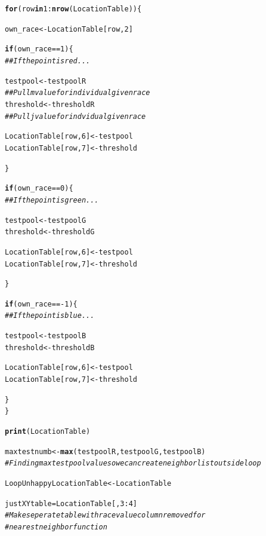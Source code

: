 \documentclass{article}\usepackage[]{graphicx}\usepackage[]{color}
\makeatletter
\newcommand{\hlnum}[1]{\textcolor[rgb]{0.686,0.059,0.569}{#1}}%
\newcommand{\hlcom}[1]{\textcolor[rgb]{0.678,0.584,0.686}{\textit{#1}}}%
\newcommand{\hlopt}[1]{\textcolor[rgb]{0,0,0}{#1}}%
\newcommand{\hlstd}[1]{\textcolor[rgb]{0.345,0.345,0.345}{#1}}%
\newcommand{\hlkwa}[1]{\textcolor[rgb]{0.161,0.373,0.58}{\textbf{#1}}}%
\newcommand{\hlkwb}[1]{\textcolor[rgb]{0.69,0.353,0.396}{#1}}%
\newcommand{\hlkwd}[1]{\textcolor[rgb]{0.737,0.353,0.396}{\textbf{#1}}}%
\newenvironment{kframe}{%
 \def\at@end@of@kframe{}%
 \ifinner\ifhmode%
  \def\at@end@of@kframe{\end{minipage}}%
  \begin{minipage}{\columnwidth}%
 \fi\fi%
 \def\FrameCommand##1{\hskip\@totalleftmargin \hskip-\fboxsep
 \colorbox{shadecolor}{##1}\hskip-\fboxsep
     \hskip-\linewidth \hskip-\@totalleftmargin \hskip\columnwidth}%
 \MakeFramed {\advance\hsize-\width
   \@totalleftmargin\z@ \linewidth\hsize
   \@setminipage}}%
 {\par\unskip\endMakeFramed%
 \at@end@of@kframe}
\newenvironment{knitrout}{}{} %
\makeatother
\begin{document}
\begin{knitrout}
\begin{kframe}
\begin{alltt}
  \hlkwa{for} \hlstd{(row} \hlkwa{in} \hlnum{1}\hlopt{:}\hlkwd{nrow}\hlstd{(LocationTable))\{}

    \hlstd{own_race} \hlkwb{<-} \hlstd{LocationTable[row,}\hlnum{2}\hlstd{]}

    \hlkwa{if}\hlstd{(own_race} \hlopt{==} \hlnum{1}\hlstd{)\{}
    \hlcom{##If the point is red...}

        \hlstd{testpool} \hlkwb{<-} \hlstd{testpoolR}
        \hlcom{## Pull m value for individual given race}
        \hlstd{threshold} \hlkwb{<-} \hlstd{thresholdR}
        \hlcom{##Pull j value for indvidual given race}

        \hlstd{LocationTable[row,}\hlnum{6}\hlstd{]} \hlkwb{<-} \hlstd{testpool}
        \hlstd{LocationTable[row,}\hlnum{7}\hlstd{]} \hlkwb{<-} \hlstd{threshold}

      \hlstd{\}}

      \hlkwa{if}\hlstd{(own_race} \hlopt{==} \hlnum{0}\hlstd{)\{}
      \hlcom{##If the point is green...}

        \hlstd{testpool} \hlkwb{<-} \hlstd{testpoolG}
        \hlstd{threshold} \hlkwb{<-} \hlstd{thresholdG}

        \hlstd{LocationTable[row,}\hlnum{6}\hlstd{]} \hlkwb{<-} \hlstd{testpool}
        \hlstd{LocationTable[row,}\hlnum{7}\hlstd{]} \hlkwb{<-} \hlstd{threshold}

      \hlstd{\}}

      \hlkwa{if}\hlstd{(own_race} \hlopt{== -}\hlnum{1}\hlstd{)\{}
      \hlcom{##If the point is blue...}

        \hlstd{testpool} \hlkwb{<-} \hlstd{testpoolB}
        \hlstd{threshold} \hlkwb{<-} \hlstd{thresholdB}

        \hlstd{LocationTable[row,}\hlnum{6}\hlstd{]} \hlkwb{<-} \hlstd{testpool}
        \hlstd{LocationTable[row,}\hlnum{7}\hlstd{]} \hlkwb{<-} \hlstd{threshold}

      \hlstd{\}}
  \hlstd{\}}

  \hlkwd{print}\hlstd{(LocationTable)}

  \hlstd{maxtestnumb} \hlkwb{<-} \hlkwd{max}\hlstd{(testpoolR, testpoolG, testpoolB)}
  \hlcom{#Finding max testpool value so we can create neighborlist outside loop}

  \hlstd{LoopUnhappyLocationTable} \hlkwb{<-} \hlstd{LocationTable}

  \hlstd{justXYtable} \hlkwb{=} \hlstd{LocationTable[,}\hlnum{3}\hlopt{:}\hlnum{4}\hlstd{]}
  \hlcom{#Make seperate table with race value column removed for}
  \hlcom{#nearest neighbor function}


\end{alltt}
\end{kframe}
\end{knitrout}
\end{document}
